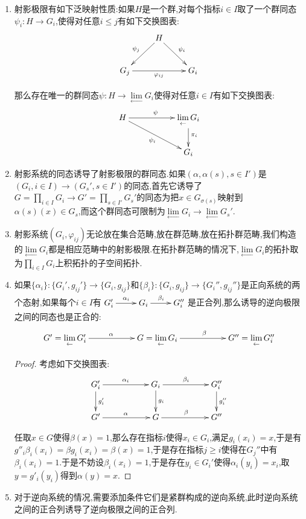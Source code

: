 \begin{enumerate}
	\item 射影极限有如下泛映射性质:如果$H$是一个群,对每个指标$i\in I$取了一个群同态$\psi_i:H\to G_i$,使得对任意$i\le j$有如下交换图表:
	$$\xymatrix{&H\ar[dl]_{\psi_j}\ar[dr]^{\psi_i}&\\G_j\ar[rr]_{\varphi_{ij}}&&G_i}$$
	
	那么存在唯一的群同态$\psi:H\to\lim\limits_{\leftarrow}G_i$使得对任意$i\in I$有如下交换图表:
	$$\xymatrix{H\ar[rr]^{\psi}\ar[drr]_{\psi_i}&&\lim\limits_{\leftarrow}G_i\ar[d]^{\pi_i}\\&&G_i}$$
	\item 射影系统的同态诱导了射影极限的群同态.如果$(\alpha,\alpha(s),s\in I')$是$(G_i,i\in I)\to(G_s',s\in I')$的同态,首先它诱导了$G=\prod_{i\in I}G_i\to G'=\prod_{s\in I'}G_s'$的同态为把$x\in G_{\sigma(s)}$映射到$\alpha(s)(x)\in G_s$,而这个群同态可限制为$\lim\limits_{\leftarrow}G_i\to\lim\limits_{\leftarrow}G_s'$.
	\item 射影系统$(G_i,\varphi_{ij})$无论放在集合范畴,放在群范畴,放在拓扑群范畴,我们构造的$\lim\limits_{\leftarrow}G_i$都是相应范畴中的射影极限.在拓扑群范畴的情况下,$\lim\limits_{\leftarrow}G_i$的拓扑取为$\prod_{i\in I}G_i$上积拓扑的子空间拓扑.
	\item 如果$\{\alpha_i\}:\{G_i',g_{ij}'\}\to\{G_i,g_{ij}\}$和$\{\beta_i\}:\{G_i,g_{ij}\}\to\{G_i'',g_{ij}''\}$是正向系统的两个态射,如果每个$i\in I$有$\xymatrix{G_i'\ar[r]^{\alpha_i}&G_i\ar[r]^{\beta_i}&G_i''}$是正合列,那么诱导的逆向极限之间的同态也是正合的:
	$$\xymatrix{G'=\lim\limits_{\leftarrow}G_i'\ar[rr]^{\alpha}&&G=\lim\limits_{\leftarrow}G_i\ar[rr]^{\beta}&&G''=\lim\limits_{\leftarrow}G_i''}$$
	\begin{proof}
		
		考虑如下交换图表:
		$$\xymatrix{G_i'\ar[rr]^{\alpha_i}\ar[d]^{g_i'}&&G_i\ar[rr]^{\beta_i}\ar[d]^{g_i}&&G_i''\ar[d]^{g_i''}\\G'\ar[rr]^{\alpha}&&G\ar[rr]^{\beta}&&G''}$$
		
		任取$x\in G$使得$\beta(x)=1$,那么存在指标$i$使得$x_i\in G_i$,满足$g_i(x_i)=x$,于是有$g''_i\beta_i(x_i)=\beta g_i(x_i)=\beta(x)=1$,于是存在指标$j\ge i$使得在$G_j''$中有$\beta_i(x_i)=1$.于是不妨设$\beta_i(x_i)=1$,于是存在$y_i\in G_i'$使得$\alpha_i(y_i)=x_i$,取$y=g'_i(y_i)$得到$\alpha(y)=x$.
	\end{proof}
	\item 对于逆向系统的情况,需要添加条件它们是紧群构成的逆向系统,此时逆向系统之间的正合列诱导了逆向极限之间的正合列.
\end{enumerate}

